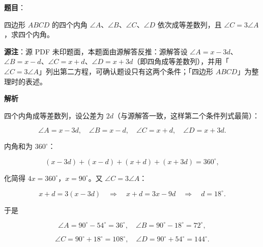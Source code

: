 \begin{answer}

\textbf{题目}：

四边形 $ABCD$ 的四个内角 $\angle A$、$\angle B$、$\angle C$、$\angle D$ 依次成等差数列，且 $\angle C=3\angle A$，求四个内角。

\begin{gktip}
\textbf{源注}：源 PDF 未印题面，本题面由源解答反推：源解答设 $\angle A=x-3d$、$\angle B=x-d$、$\angle C=x+d$、$\angle D=x+3d$（即四角成等差数列），并用「$\angle C=3\angle A$」列出第二方程，可确认题设只有这两个条件；「四边形 $ABCD$」为整理时的表述。
\end{gktip}

\textbf{解析}

四个内角成等差数列，设公差为 $2d$（与源解答一致，这样第二个条件列式最简）：

\nopagebreak[4]
\[
\angle A=x-3d,
\quad
\angle B=x-d,
\quad
\angle C=x+d,
\quad
\angle D=x+3d.
\]

内角和为 $360^\circ$：

\nopagebreak[4]
\[
(x-3d)+(x-d)+(x+d)+(x+3d)=360^\circ,
\]

化简得 $4x=360^\circ$，$x=90^\circ$。又 $\angle C=3\angle A$：

\nopagebreak[4]
\[
x+d=3(x-3d)
\quad\Longrightarrow\quad
x+d=3x-9d
\quad\Longrightarrow\quad
d=18^\circ.
\]

于是

\nopagebreak[4]
\[
\angle A=90^\circ-54^\circ=36^\circ,
\quad
\angle B=90^\circ-18^\circ=72^\circ,
\]

\nopagebreak[4]
\[
\angle C=90^\circ+18^\circ=108^\circ,
\quad
\angle D=90^\circ+54^\circ=144^\circ.
\]


\end{answer}
